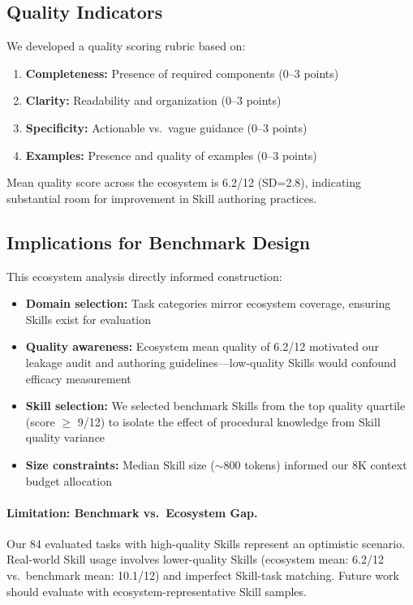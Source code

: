 \subsection{Quality Indicators}

We developed a quality scoring rubric based on:
\begin{enumerate}[nosep]
    \item \textbf{Completeness:} Presence of required components (0--3 points)
    \item \textbf{Clarity:} Readability and organization (0--3 points)
    \item \textbf{Specificity:} Actionable vs.\ vague guidance (0--3 points)
    \item \textbf{Examples:} Presence and quality of examples (0--3 points)
\end{enumerate}

Mean quality score across the ecosystem is 6.2/12 (SD=2.8), indicating substantial room for improvement in Skill authoring practices.

\subsection{Implications for Benchmark Design}

This ecosystem analysis directly informed \benchmarkName{} construction:
\begin{itemize}[nosep]
    \item \textbf{Domain selection:} Task categories mirror ecosystem coverage, ensuring Skills exist for evaluation
    \item \textbf{Quality awareness:} Ecosystem mean quality of 6.2/12 motivated our leakage audit and authoring guidelines---low-quality Skills would confound efficacy measurement
    \item \textbf{Skill selection:} We selected benchmark Skills from the top quality quartile (score $\geq$ 9/12) to isolate the effect of procedural knowledge from Skill quality variance
    \item \textbf{Size constraints:} Median Skill size ($\sim$800 tokens) informed our 8K context budget allocation
\end{itemize}

\paragraph{Limitation: Benchmark vs.\ Ecosystem Gap.}
Our 84 evaluated tasks with high-quality Skills represent an optimistic scenario.
Real-world Skill usage involves lower-quality Skills (ecosystem mean: 6.2/12 vs.\ benchmark mean: 10.1/12) and imperfect Skill-task matching.
Future work should evaluate with ecosystem-representative Skill samples.


